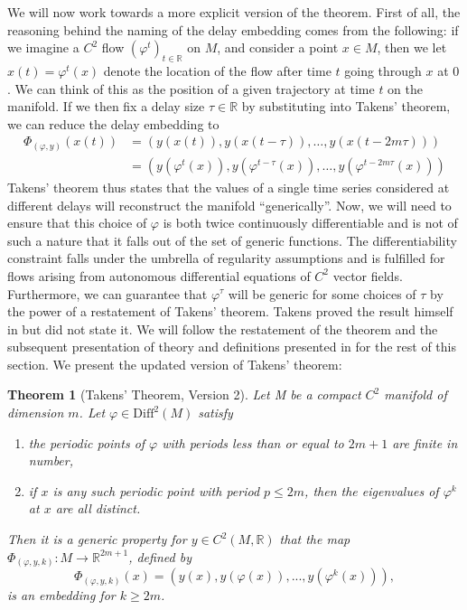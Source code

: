 \documentclass[11pt, a4paper]{memoir}
\theoremstyle{break}
\newtheorem{thm}{Theorem}
\theoremstyle{break}
\theoremstyle{nonumberplain}
\newcommand{\mR}{\mathbb{R}}
\begin{document}
We will now work towards a more explicit version of the theorem. First of all, the reasoning behind the naming of the delay embedding comes from the following: if we imagine a $C^2$ flow $(\varphi^t)_{t\in \mR}$ on $M$, and consider a point $x\in M$, then we let $x(t)=\varphi^t(x)$ denote the location of the flow after time $t$ going through $x$ at $0$. We can think of this as the position of a given trajectory at time $t$ on the manifold. If we then fix a delay size $\tau\in \mR$ by substituting into Takens' theorem, we can reduce the delay embedding to
\begin{align*}
\Phi_{(\varphi,y)}(x(t))&=\left(y(x(t)),y(x(t-\tau)),\ldots,y(x(t-2m\tau))\right)\\
&=\left(y(\varphi^t(x)),y(\varphi^{t-\tau}(x)),\ldots,y(\varphi^{t-2m\tau}(x))\right)
\end{align*}
Takens' theorem thus states that the values of a single time series considered at different delays will reconstruct the manifold \enquote{generically}. Now, we will need to ensure that this choice of $\varphi$ is both twice continuously differentiable and is not of such a nature that it falls out of the set of generic functions. The differentiability constraint falls under the umbrella of regularity assumptions and is fulfilled for flows arising from autonomous differential equations of $C^2$ vector fields. Furthermore, we can guarantee that $\varphi^\tau$ will be generic for some choices of $\tau$ by the power of a restatement of Takens' theorem. Takens proved the result himself in \cite{Takens} but did not state it. We will follow the restatement of the theorem and the subsequent presentation of theory and definitions presented in \cite{Huke} for the rest of this section. We present the updated version of Takens' theorem:
\begin{thm}[Takens' Theorem, Version 2]\label{v2}
Let M be a compact $C^2$ manifold of dimension $m$. Let $\varphi\in\text{Diff}^2(M)$ satisfy
\begin{enumerate}[label=(\roman*)]
	\item the periodic points of $\varphi$ with periods less than or equal to $2m+1$ are finite in number,
	\item if $x$ is any such periodic point with period $p\leqslant 2m$, then the eigenvalues of $\varphi^k$ at $x$ are all distinct.
\end{enumerate}
 Then it is a generic property for $y\in C^2(M,\mR)$ that the map $\Phi_{(\varphi,y,k)}:M\to \mathbb{R}^{2m+1}$, defined by
\begin{equation}\label{delayemb}
\Phi_{(\varphi,y,k)}(x)=(y(x),y(\varphi(x)),...,y(\varphi^{k}(x))),
\end{equation}
is an embedding for $k\geqslant 2m$. \cite{Huke}
\end{thm}
\end{document}
